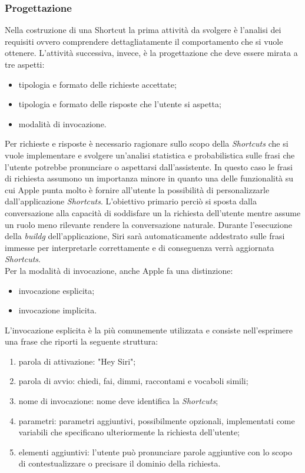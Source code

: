 		\subsubsection{Progettazione}
		Nella costruzione di una Shortcut la prima attività da svolgere è l'analisi dei requisiti ovvero comprendere dettagliatamente il comportamento che si vuole ottenere. L'attività successiva, invece, è la progettazione che deve essere mirata a tre aspetti:
		\begin{itemize}
			\item tipologia e formato delle richieste accettate;
			\item tipologia e formato delle risposte che l'utente si aspetta;
			\item modalità di invocazione.
		\end{itemize}
		Per richieste e risposte è necessario ragionare sullo scopo della \emph{Shortcuts} che si vuole implementare e svolgere un'analisi statistica e probabilistica sulle frasi che l'utente potrebbe pronunciare o aspettarsi dall'assistente. In questo caso le frasi di richiesta assumono un importanza minore in quanto una delle funzionalità su cui Apple punta molto è fornire all'utente la possibilità di personalizzarle dall'applicazione \emph{Shortcuts}. L'obiettivo primario perciò si sposta dalla conversazione alla capacità di soddisfare un la richiesta dell'utente mentre assume un ruolo meno rilevante rendere la conversazione naturale. Durante l'esecuzione della \emph{\gls{buildg}} dell'applicazione, Siri sarà automaticamente addestrato sulle frasi immesse per interpretarle correttamente e di conseguenza verrà aggiornata \emph{Shortcuts}. \\
		Per la modalità di invocazione, anche Apple fa una distinzione:
		\begin{itemize}
			\item invocazione esplicita;
			\item invocazione implicita.
		\end{itemize}
		L'invocazione esplicita è la più comunemente utilizzata e consiste nell'esprimere una frase che riporti la seguente struttura:
		\begin{enumerate}
			\item parola di attivazione: "Hey Siri";
			\item parola di avvio: chiedi, fai, dimmi, raccontami e vocaboli simili;
			\item nome di invocazione: nome deve identifica la \emph{Shortcuts};
			\item parametri: parametri aggiuntivi, possibilmente opzionali, implementati come variabili che specificano ulteriormente la richiesta dell'utente;
			\item elementi aggiuntivi: l'utente può pronunciare parole aggiuntive con lo scopo di contestualizzare o precisare il dominio della richiesta.
		\end{enumerate}
